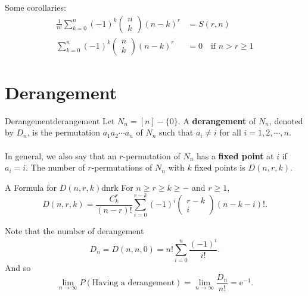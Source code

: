 \documentclass[math]{amznotes}
\theoremstyle{remark}
\begin{document}
Some corollaries:
\begin{align*}
    \frac{1}{n!} \sum_{k = 0}^{n}(-1)^k \begin{pmatrix}
        n \\
        k
    \end{pmatrix}(n - k)^r & = S(r, n) \\
    \sum_{k = 0}^{n}(-1)^k \begin{pmatrix}
        n \\
        k
    \end{pmatrix}(n - k)^r & = 0 \quad \textrm{if }n > r \geq 1
\end{align*}
\section{Derangement}
\begin{dfnbox}{Derangement}{derangement}
    Let $N_n = [n] - \{0\}$. A {\color{red} \textbf{derangement}} of $N_n$, denoted by $D_n$, is the permutation $a_1a_2\cdots a_n$ of $N_n$ such that $a_i \neq i$ for all $i = 1, 2, \cdots, n$.
    \\\\
    In general, we also say that an $r$-permutation of $N_n$ has a {\color{red} \textbf{fixed point}} at $i$ if $a_i = i$. The number of $r$-permutations of $N_n$ with $k$ fixed points is $D(n, r, k)$.
\end{dfnbox}
\begin{thmbox}{A Formula for $D(n, r, k)$}{dnrk}
    For $n \geq r \geq k \geq -$ and $r \geq 1$,
    \begin{equation*}
        D(n, r, k) = \frac{C^r_k}{(n - r)!}\sum_{i = 0}^{r - k}(-1)^i \begin{pmatrix}
            r - k \\
            i
        \end{pmatrix}(n - k - i)!.
    \end{equation*}
\end{thmbox}
Note that the number of derangement
\begin{equation*}
    D_n = D(n, n, 0) = n!\sum_{i = 0}^{n}\frac{(-1)^i}{i!}.
\end{equation*}
And so
\begin{equation*}
    \lim_{n \to \infty}P(\textrm{Having a derangement}) = \lim_{n \to \infty}\frac{D_n}{n!} = \mathrm{e}^{-1}.
\end{equation*}

    
\end{document}
